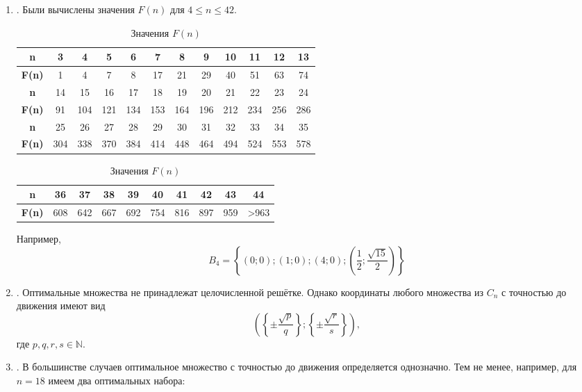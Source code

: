 \documentclass[a4paper,14pt]{article} %
\begin{document}
\begin{enumerate}

\item.
Были вычислены значения $F(n)$ для $4\leq n \leq 42$.

\begin{table}[H]
\caption{Значения $F(n)$}
\label{tabular:pc_counted}
\begin{center}
\begin{tabular}{|c|c|c|c|c|c|c|c|c|c|c|c|}
\hline
\textbf{n}    &  3 & 4 & 5 & 6 &  7 &  8 &  9 & 10 & 11 & 12 & 13 \\
\hline
\textbf{F(n)} &  1 & 4 & 7 & 8 & 17 & 21 & 29 & 40 & 51 & 63 & 74  \\
\hline
\hline
\textbf{n}    &  14 &  15 &  16 &  17 &  18 &  19 &  20 &  21 &  22 &  23 &  24 \\
\hline
\textbf{F(n)} &  91 & 104 & 121 & 134 & 153 & 164 & 196 & 212 & 234 & 256 & 286  \\
\hline
\hline
\textbf{n}    &  25 &  26 &  27 &  28 &  29 &  30 &  31 &  32 &  33 &  34 &  35 \\
\hline
\textbf{F(n)} & 304 & 338 & 370 & 384 & 414 & 448 & 464 & 494 & 524 & 553 & 578  \\
\hline
\end{tabular}
\begin{tabular}{|c|c|c|c|c|c|c|c|c|c|}
\hline
\textbf{n}    &  36 &  37 &  38 &  39 &  40 &  41 &  42 &  43 & 44 \\
\hline
\textbf{F(n)} & 608 & 642 & 667 & 692 & 754 & 816 & 897 & 959 & >963 \\
\hline
\end{tabular}
\end{center}
\end{table}

Например,
$$
B_4=\left\{( 0 ; 0 ); ( 1 ; 0 ); ( 4 ; 0 ); \left(  \frac{1}{2}  ; \frac{\sqrt{15}}{2} \right) \right\}
$$

\item.
Оптимальные множества не принадлежат целочисленной решётке.
Однако координаты любого множества из $C_n$ с точностью до движения имеют вид
$$
	\left(
		\left\{\pm\frac{\sqrt{p}}{q}\right\};
		\left\{\pm\frac{\sqrt{r}}{s}\right\}
	\right),$$
где $p,q,r,s \in \mathbb{N}$.

\item.
В большинстве случаев оптимальное множество с точностью до движения определяется однозначно.
Тем не менее, например, для $n=18$ имеем два оптимальных набора:


\end{enumerate}
\end{document}
